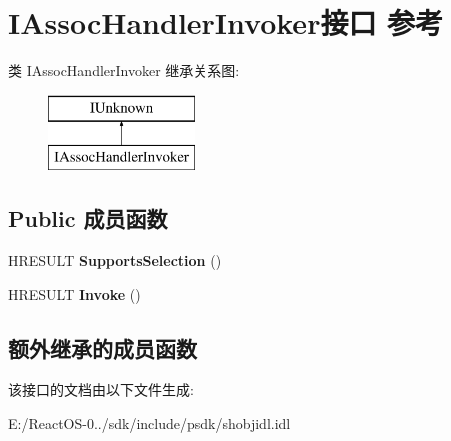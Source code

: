 \hypertarget{interface_i_assoc_handler_invoker}{}\section{I\+Assoc\+Handler\+Invoker接口 参考}
\label{interface_i_assoc_handler_invoker}
类 I\+Assoc\+Handler\+Invoker 继承关系图\+:\begin{figure}[H]
\begin{center}
\leavevmode
\includegraphics[height=2.000000cm]{interface_i_assoc_handler_invoker}
\end{center}
\end{figure}
\subsection*{Public 成员函数}
\begin{DoxyCompactItemize}
\item 
\mbox{\label{interface_i_assoc_handler_invoker_aea6d68636473f3f834d2509d6be2e29e}} 
H\+R\+E\+S\+U\+LT {\bfseries Supports\+Selection} ()
\item 
\mbox{\label{interface_i_assoc_handler_invoker_a57bbde95359d9f894c490d92d86f91c9}} 
H\+R\+E\+S\+U\+LT {\bfseries Invoke} ()
\end{DoxyCompactItemize}
\subsection*{额外继承的成员函数}


该接口的文档由以下文件生成\+:\begin{DoxyCompactItemize}
\item 
E\+:/\+React\+O\+S-\/0../sdk/include/psdk/shobjidl.\+idl\end{DoxyCompactItemize}
